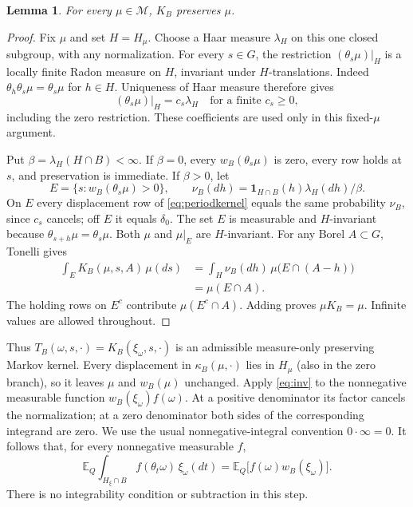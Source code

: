 \documentclass[11pt]{article}
\newtheorem{lemma}{Lemma}
\newcommand{\MM}{\mathcal M}
\newcommand{\ind}{\mathbf 1}
\newcommand{\EQ}{\mathbb E_Q}
\begin{document}
\begin{lemma}\label{lem:periodpres}
For every $\mu\in\MM$, $K_B$ preserves $\mu$.
\end{lemma}
\begin{proof}
Fix $\mu$ and set $H=H_\mu$. Choose a Haar measure $\lambda_H$ on this one closed subgroup, with any normalization. For every $s\in G$, the restriction $(\theta_s\mu)|_H$ is a locally finite Radon measure on $H$, invariant under $H$-translations. Indeed $\theta_h\theta_s\mu=\theta_s\mu$ for $h\in H$. Uniqueness of Haar measure therefore gives
\[
 (\theta_s\mu)|_H=c_s\lambda_H\quad\text{for a finite }c_s\geq0,
\]
including the zero restriction. These coefficients are used only in this fixed-$\mu$ argument.

Put $\beta=\lambda_H(H\cap B)<\infty$. If $\beta=0$, every $w_B(\theta_s\mu)$ is zero, every row holds at $s$, and preservation is immediate. If $\beta>0$, let
\[
 E=\{s:w_B(\theta_s\mu)>0\},\qquad
 \nu_B(dh)=\ind_{H\cap B}(h)\lambda_H(dh)/\beta.
\]
On $E$ every displacement row of \eqref{eq:periodkernel} equals the same probability $\nu_B$, since $c_s$ cancels; off $E$ it equals $\delta_0$. The set $E$ is measurable and $H$-invariant because $\theta_{s+h}\mu=\theta_s\mu$. Both $\mu$ and $\mu|_E$ are $H$-invariant. For any Borel $A\subset G$, Tonelli gives
\begin{align*}
 \int_E K_B(\mu,s,A)\,\mu(ds)
 &=\int_H\nu_B(dh)\,\mu\bigl(E\cap(A-h)\bigr)\\
 &=\mu(E\cap A).
\end{align*}
The holding rows on $E^c$ contribute $\mu(E^c\cap A)$. Adding proves $\mu K_B=\mu$. Infinite values are allowed throughout.
\end{proof}

Thus $T_B(\omega,s,\cdot)=K_B(\xi_\omega,s,\cdot)$ is an admissible measure-only preserving Markov kernel. Every displacement in $\kappa_B(\mu,\cdot)$ lies in $H_\mu$ (also in the zero branch), so it leaves $\mu$ and $w_B(\mu)$ unchanged. Apply \eqref{eq:inv} to the nonnegative measurable function $w_B(\xi_\omega)f(\omega)$. At a positive denominator its factor cancels the normalization; at a zero denominator both sides of the corresponding integrand are zero. We use the usual nonnegative-integral convention $0\cdot\infty=0$. It follows that, for every nonnegative measurable $f$,
\begin{equation}
 \EQ\int_{H_\xi\cap B} f(\theta_t\omega)\,\xi_\omega(dt)
 =\EQ\bigl[f(\omega)w_B(\xi_\omega)\bigr]. \label{eq:periodinv}
\end{equation}
There is no integrability condition or subtraction in this step.
\end{document}
